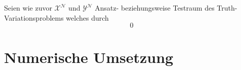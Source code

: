 Seien wie zuvor $\mathcal X^{\mathcal N}$ und $\mathcal Y^{\mathcal N}$ Ansatz- beziehungsweise Testraum des Truth-Variationsproblems welches durch
\begin{equation}
0
\end{equation}




\section{Numerische Umsetzung} %
\label{sub:grb:rb:numerische_umsetzung}



